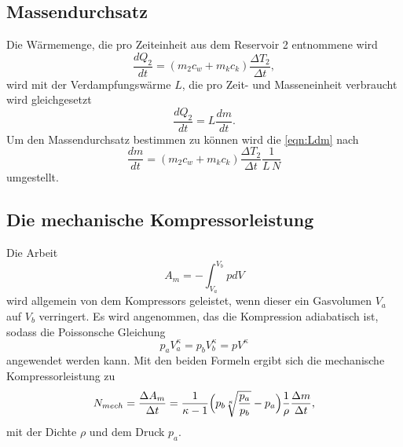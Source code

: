  \subsection{Massendurchsatz} %
 \label{sub:Massendurchsatz}
 Die Wärmemenge, die pro Zeiteinheit aus dem Reservoir 2 entnommene wird
 \begin{equation}
     \frac{dQ_2}{dt} = (m_2 c_w + m_k c_k)\frac{\Delta T_2}{\Delta t},
     \label{eqn:DeltaQ2}
 \end{equation}
wird mit der Verdampfungswärme $L$, die pro Zeit- und Masseneinheit verbraucht wird gleichgesetzt
\begin{equation}
    \frac{dQ_2}{dt} = L \frac{dm}{dt}.
    \label{eqn:Ldm}
\end{equation}
Um den Massendurchsatz bestimmen zu können wird die \autoref{eqn:Ldm} nach
\begin{equation}
    \frac{dm}{dt} = (m_2 c_w + m_k c_k)\frac{\Delta T_2}{\Delta t} \frac{1}{L\,N}
\end{equation}
umgestellt.

\subsection{Die mechanische Kompressorleistung} %
\label{sub:Die mechanische Kompressorleistung}
Die Arbeit 
 \begin{equation*}
     A_m = - \int_{V_a}^{V_b} p dV
 \end{equation*}
wird allgemein von dem Kompressors geleistet, wenn dieser ein Gasvolumen $V_a$ auf $V_b$ verringert.
Es wird angenommen, das die Kompression adiabatisch ist, sodass die Poissonsche Gleichung 
 \begin{equation*}
     p_a V_a^{\kappa} = p_b V_b^{\kappa} = p V^{\kappa}
 \end{equation*}
angewendet werden kann.
Mit den beiden Formeln ergibt sich die mechanische Kompressorleistung zu
\begin{equation}
    N_{mech} = \frac{\Delta A_m}{\Delta t} = \frac{1}{\kappa - 1} \Bigl(p_b \sqrt[\kappa]{\frac{p_a}{p_b}}-p_a \Bigr) \frac{1}{\rho}\frac{\Delta m}{\Delta t},
    \label{eqn:Kompressorleistung}
\end{equation}
mit der Dichte $\rho$ und dem Druck $p_a$.
